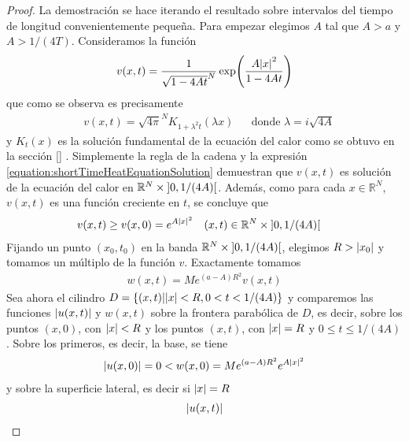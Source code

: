 \documentclass{article}
\newcommand{\realNumbers}{\mathbb{R}}
\theoremstyle{definition}
\theoremstyle{remark}
\newcommand{\leftOpenInterval}{\left]}
\newcommand{\rightOpenInterval}{\right[}
\newcommand{\leftClosedInterval}{\left[}
\newcommand{\rightClosedInterval}{\right]}
\newcommand{\interval}[3]{%
  \ifstrequal{#1}{oo}{%
    \leftOpenInterval #2, #3 \rightOpenInterval%
  }{%
    \ifstrequal{#1}{co}{%
      \leftClosedInterval #2, #3 \rightOpenInterval%
    }{%
      \ifstrequal{#1}{oc}{
        \leftOpenInterval #2, #3 \rightClosedInterval%
      }{%
        \ifstrequal{#1}{cc}{
          \leftClosedInterval #2, #3 \rightClosedInterval
        }{%
        }%
      }%
    }%
  }%
}
\begin{document}
  \begin{proof}
    La demostración se hace iterando el resultado sobre intervalos del tiempo de longitud convenientemente pequeña.
    Para empezar elegimos \(A\) tal que \(A > a\) y \(A > 1 / (4 T)\).
    Consideramos la función
    \begin{align}
      v(x, t) = \frac{1}{\sqrt{1 - 4 A t}^N} \exp\!\left(\frac{A \abs{x}^2}{1 - 4 A t}\right)
    \end{align}
    que como se observa es precisamente
    \begin{align}
      \label{equation:shortTimeHeatEquationSolution}
      &v(x, t)
      =
      \sqrt{4 \pi}^N K_{1 + \lambda^2 t} (\lambda x)
      && \text{donde } \lambda = i \sqrt{4A}
    \end{align}
    y \(K_t(x)\) es la solución fundamental de la ecuación del calor como se obtuvo en la sección 
    \ref{}  %
    .
    Simplemente la regla de la cadena y la expresión
    \ref{equation:shortTimeHeatEquationSolution}
    demuestran que \(v(x, t)\) es solución de la ecuación del calor en \(\realNumbers^N \times \interval{oo}{0}{1 / (4 A)}\).
    Además, como para cada \(x \in \realNumbers^N\), \(v(x, t)\) es una función creciente en \(t\), se concluye que
    \begin{align}
      &v(x, t)
      \geq
      v(x, 0)
      =
      e^{A \abs{x}^2}
      && (x, t) \in \realNumbers^N \times \interval{oo}{0}{1 / (4 A)}
    \end{align}
    Fijando un punto \((x_0, t_0)\) en la banda \(\realNumbers^N \times \interval{oo}{0}{1 / (4 A)}\), elegimos \(R > \abs{x_0}\) y tomamos un múltiplo de la función \(v\).
    Exactamente tomamos
    \begin{align}
      w(x, t)
      =
      M e^{(a - A) R^2} v(x, t)
    \end{align}
    Sea ahora el cilindro \(D = \{(x, t) | \abs{x} < R, 0 < t < 1 / (4 A)\}\) y comparemos las funciones \(\abs{u(x, t)}\) y \(w(x, t)\) sobre la frontera parabólica de \(D\), es decir, sobre los puntos \((x, 0)\), con \(\abs{x} < R\) y los puntos \((x, t)\), con \(\abs{x} = R\) y \(0 \leq t \leq 1 / (4 A)\).
    Sobre los primeros, es decir, la base, se tiene 
    \begin{align}
      \abs{u(x, 0)}
      =
      0
      <
      w(x, 0)
      =
      M e^{(a - A) R^2} e^{A \abs{x}^2}
    \end{align}
    y sobre la superficie lateral, es decir si \(\abs{x} = R\)
    \begin{align}
      \abs{u(x, t)}

\end{align}
\end{proof}
\end{document}
